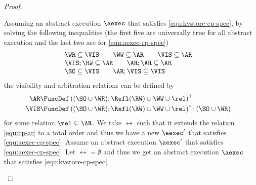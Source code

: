 \begin{proof}
\begin{enumerate}
    Assuming an abstract execution \( \aexec \) that satisfies \cref{equ:kvstore-cp-spec},
    by solving the following inequalities 
    (the first five are universally true for all abstract execution 
    and the last two are for \cref{equ:aexec-cp-spec})
    \[
    \begin{array}{@{}l@{}}
        \WR \subseteq \VIS 
        \qquad \WW \subseteq \AR 
        \qquad \VIS \subseteq \AR \\
        \VIS ; \RW \subseteq \AR 
        \qquad \AR ; \AR \subseteq \AR  \\
        \SO \subseteq \VIS 
        \qquad \AR ; \VIS \subseteq \VIS
    \end{array}
    \]
    the visibility and arbitration relations can be defined by 
    \begin{align}
        \AR  & \FuncDef \left( (\SO \cup \WR ) ; \Refl(\RW) \cup \WW \cup \rel \right)^+ \label{equ:cp-ar}
        \\ \VIS & \FuncDef \left( (\SO \cup \WR ) ; \Refl(\RW) \cup \WW \cup \rel \right)^* ; (\SO \cup \WR ) \label{equ:cp-vis} 
    \end{align}
    for some relation \( \rel \subseteq \AR \).
    We take \( \rel \) such that it extends the relation \cref{equ:cp-ar} to a total order and thus 
    we have a new \( \aexec' \) that satisfies \cref{equ:aexec-cp-spec}.
    Assume an abstract execution \( \aexec' \) that satisfies \cref{equ:aexec-cp-spec}.
    Let \( \rel = \emptyset \) and thus we get an abstract execution \( \aexec \) that satisfies \cref{equ:kvstore-cp-spec}. \qedhere
\end{enumerate}
\end{proof}

